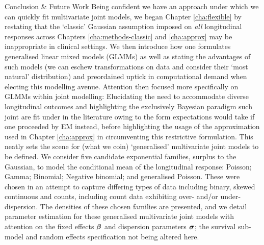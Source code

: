 \begin{chapter}{\label{cha:conclusion}Conclusion \& Future Work}
Being confident we have an approach under which we can quickly fit multivariate joint models, we began Chapter \ref{cha:flexible} by restating that the `classic' Gaussian assumption imposed on \textit{all} longitudinal responses across Chapters \ref{cha:methods-classic} and \ref{cha:approx} may be inappropriate in clinical settings. We then introduce how one formulates generalised linear mixed models (GLMMs) as well as stating the advantages of such models (\eg we can eschew transformations on data and consider their `most natural' distribution) and preordained uptick in computational demand when electing this modelling avenue.\newline
Attention then focused more specifically on GLMMs within joint modelling: Elucidating the need to accommodate diverse longitudinal outcomes and highlighting the exclusively Bayesian paradigm such joint are fit under in the literature owing to the form expectations would take if one proceeded by \eg EM instead, before highlighting the usage of the approximation used in Chapter \ref{cha:approx} in circumventing this restrictive formulation. This neatly sets the scene for (what we coin) `generalised' multivariate joint models to be defined.\newline
We consider five candidate exponential families, surplus to the Gaussian, to model the conditional mean of the longitudinal response: Poisson; Gamma; Binomial; Negative binomial; and generalised Poisson. These were chosen in an attempt to capture differing types of data including binary, skewed continuous and counts, including count data exhibiting over- and/or under-dispersion. The densities of these chosen families are presented, and we detail parameter estimation for these generalised multivariate joint models with attention on the fixed effects $\bm{\beta}$ and dispersion parameters $\bm{\sigma}$; the survival sub-model and random effects specification not being altered here.\newline

\end{chapter}
